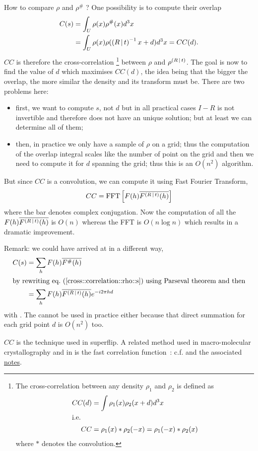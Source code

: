 \documentclass[11pt]{article}
\begin{document}
How to compare $\rho$ and $\rho^\#$ ? One possibility is to compute their overlap
\begin{align}
C(s) &= \int_U \rho(x) \rho^\#(x) d^3x  \label{cross::correlation::rho::s}\\
&= \int_U \rho(x) \rho(\left( R\,\vert\, t \right)^{-1}x + d)d^3x = CC(d). \label{cross::correlation::rho::d}
\end{align}
$CC$ is therefore the cross-correlation%
\footnote{The cross-correlation between any density $\rho_1$ and $\rho_2$ is defined as
\begin{align}
CC(d) &= \int \rho_1(x) \rho_2(x+d)d^3x \\
\intertext{i.e.}
CC &= \rho_1(x) * \rho_2(-x) = \rho_1(-x) * \rho_2(x)
\end{align}
where $*$ denotes the convolution.} 
between $\rho$ and $\rho^{\left( R\,\vert\, t \right)}$.
The goal is now to find the value of $d$ which maximises $CC(d)$, the idea being that the bigger the overlap, the more similar the density and its transform must be. There are two problems here:
\begin{itemize}
\item first, we want to compute $s$, not $d$ but in all practical cases $I-R$ is not invertible and therefore  does not have an unique solution; but at least we can determine all of them;
\item then, in practice we only have a sample of $\rho$ on a grid; thus the computation of the overlap integral scales like the number of point on the grid and then we need to compute it for $d$ spanning the grid; thus this is an $O(n^2)$ algorithm.
\end{itemize}
But since $CC$ is a convolution, we can compute it using Fast Fourier Transform,
\begin{equation}
CC = \mathrm{FFT}\left[F(h)\overline{F^{\left( R\,\vert\, t \right)}(h)}\right]\label{CC:as::FFT}
\end{equation}
where the bar denotes complex conjugation. Now the computation of all the $F(h)\overline{F^{\left( R\,\vert\, t \right)}(h)}$ is $O(n)$ whereas the FFT is $O(n\log n)$ which results in a dramatic improvement.

Remark: we could have arrived at  in a different way,
\begin{align}
C(s) &= \sum_h F(h)\overline{F^\#(h)} \label{cross::correlation::F}\\
\intertext{by rewriting \refeq{cross::correlation::rho::s} using Parseval theorem and then}
&= \sum_h F(h) \overline{F^{\sym{R}{t}}(h)} e^{-i2\pi hd}
\end{align}
with . The  cannot be used in practice either because that direct summation for each grid point $d$ is $O(n^2)$ too.

$CC$ is the technique used in superflip. A related method used in macro-molecular crystallography and in  is the fast correlation function~\cite{J.Navaza:1995}: c.f.  and the associated \href{file://../translation_search/notes.pdf}{notes}.


\end{document}
